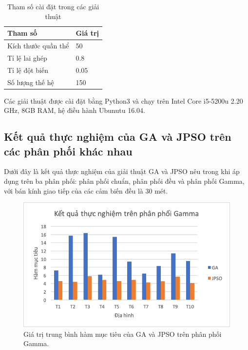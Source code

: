 \documentclass{hust}
\begin{document}
\begin{table}[H]
	\caption{Tham số cài đặt trong các giải thuật}\label{tab:2}
	\centering
	\begin{tabularx}{0.6\textwidth} {X l}
		\hline
		\textbf{Tham số}              & \textbf{Giá trị}    \\ \hline
		Kích thước quần thể    & 50  \\ 
		Tỉ lệ lai ghép & 0.8    \\
		Tỉ lệ đột biến & 0.05        \\                
		Số lượng thế hệ & 150 \\     \hline  
	\end{tabularx}
\end{table}

Các giải thuật được cài đặt bằng Python3 và chạy trên Intel Core i5-5200u 2.20 GHz, 8GB RAM, hệ điều hành Ubunutu 16.04.

\subsection{Kết quả thực nghiệm của \gls{GA} và \gls{JPSO} trên các phân phối khác nhau}
Dưới đây là kết quả thực nghiệm của giải thuật \gls{GA} và \gls{JPSO} nêu trong \cite{lu2014construction} khi áp dụng trên ba phân phối: phân phối chuẩn, phân phối đều và phân phối Gamma, với bán kính giao tiếp của các cảm biến đều là 30 mét.



\begin{figure}[H]
	\centering
	\includegraphics[scale=0.5]{images/MediumGamma30.png}
	\caption{Giá trị trung bình hàm mục tiêu của \gls{GA} và \gls{JPSO} trên phân phối Gamma.} \label{fig:medium_gamma}
\end{figure}
\end{document}
